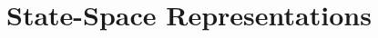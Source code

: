 \documentclass[12pt,letter]{article}
\begin{document}
	
%	

	\setcounter{section}{10}

\section{State-Space Representations}











	\pagebreak
	\renewcommand{\thepage}{}
	\renewcommand\refname{References Cited}
	\pagestyle{plain}
	
	
\end{document}
